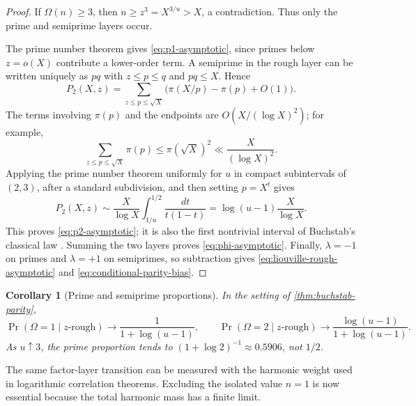 \documentclass[11pt]{article}
\newtheorem{corollary}[theorem]{Corollary}
\theoremstyle{definition}
\theoremstyle{remark}
\newcommand{\Om}{\Omega}
\begin{document}
\begin{proof}
If $\Om(n)\ge3$, then $n\ge z^3=X^{3/u}>X$, a contradiction.  Thus only the prime and semiprime layers occur.

The prime number theorem gives \eqref{eq:p1-asymptotic}, since primes below $z=o(X)$ contribute a lower-order term.  A semiprime in the rough layer can be written uniquely as $pq$ with $z\le p\le q$ and $pq\le X$.  Hence
\begin{equation}\label{eq:semiprime-sum}
 P_2(X,z)=
 \sum_{z\le p\le\sqrt X}
 \bigl(\pi(X/p)-\pi(p)+O(1)\bigr).
\end{equation}
The terms involving $\pi(p)$ and the endpoints are $O(X/(\log X)^2)$; for example,
\[
 \sum_{z\le p\le\sqrt X}\pi(p)
 \le \pi(\sqrt X)^2\ll\frac{X}{(\log X)^2}.
\]
Applying the prime number theorem uniformly for $u$ in compact subintervals of $(2,3)$, after a standard subdivision, and then setting $p=X^t$ gives
\begin{equation}\label{eq:semiprime-integral}
 P_2(X,z)
 \sim\frac{X}{\log X}
 \int_{1/u}^{1/2}\frac{dt}{t(1-t)}
 =\log(u-1)\frac{X}{\log X}.
\end{equation}
This proves \eqref{eq:p2-asymptotic}; it is also the first nontrivial interval of Buchstab's classical law \citep{Buchstab1937,MontgomeryVaughan2007}.  Summing the two layers proves \eqref{eq:phi-asymptotic}.  Finally, $\lambda=-1$ on primes and $\lambda=+1$ on semiprimes, so subtraction gives \eqref{eq:liouville-rough-asymptotic} and \eqref{eq:conditional-parity-bias}.
\end{proof}

\begin{corollary}[Prime and semiprime proportions]\label{cor:rough-proportions}
In the setting of \cref{thm:buchstab-parity},
\begin{equation}\label{eq:rough-proportions}
 \Pr(\Om=1\mid z\text{-rough})\longrightarrow
 \frac1{1+\log(u-1)},
 \qquad
 \Pr(\Om=2\mid z\text{-rough})\longrightarrow
 \frac{\log(u-1)}{1+\log(u-1)}.
\end{equation}
As $u\uparrow3$, the prime proportion tends to $(1+\log2)^{-1}\approx0.5906$, not $1/2$.
\end{corollary}

The same factor-layer transition can be measured with the harmonic weight used in logarithmic correlation theorems.  Excluding the isolated value $n=1$ is now essential because the total harmonic mass has a finite limit.
\end{document}
